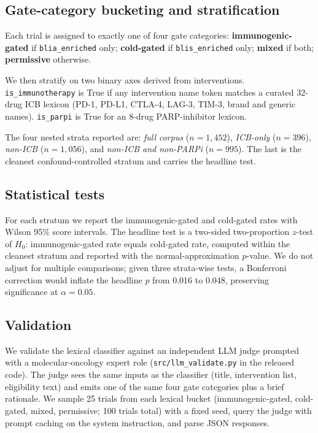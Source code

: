 \documentclass{article}
\begin{document}
\subsection{Gate-category bucketing and stratification}
Each trial is assigned to exactly one of four gate categories:
\textbf{immunogenic-gated} if \verb|blia_enriched| only;
\textbf{cold-gated} if \verb|blis_enriched| only;
\textbf{mixed} if both; \textbf{permissive} otherwise.

We then stratify on two binary axes derived from interventions.
\verb|is_immunotherapy| is True if any intervention name token
matches a curated 32-drug ICB lexicon (PD-1, PD-L1, CTLA-4, LAG-3,
TIM-3, brand and generic names).  \verb|is_parpi| is True for an
8-drug PARP-inhibitor lexicon.

The four nested strata reported are: \emph{full corpus} ($n=1{,}452$),
\emph{ICB-only} ($n=396$), \emph{non-ICB} ($n=1{,}056$), and
\emph{non-ICB and non-PARPi} ($n=995$).  The last is the cleanest
confound-controlled stratum and carries the headline test.

\subsection{Statistical tests}
For each stratum we report the immunogenic-gated and cold-gated rates
with Wilson 95\% score intervals.  The headline test is a two-sided
two-proportion $z$-test of $H_0$: immunogenic-gated rate equals
cold-gated rate, computed within the cleanest stratum and reported
with the normal-approximation $p$-value.  We do not adjust for
multiple comparisons; given three strata-wise tests, a Bonferroni
correction would inflate the headline $p$ from $0.016$ to $0.048$,
preserving significance at $\alpha=0.05$.

\subsection{Validation}
\label{sec:validation}
We validate the lexical classifier against an independent LLM judge
prompted with a molecular-oncology expert role
(\verb|src/llm_validate.py| in the released code).  The judge sees the
same inputs as the classifier (title, intervention list, eligibility
text) and emits one of the same four gate categories plus a brief
rationale.  We sample 25 trials from each lexical bucket
(immunogenic-gated, cold-gated, mixed, permissive; 100 trials total)
with a fixed seed, query the judge with prompt caching on the system
instruction, and parse JSON responses.
\end{document}
